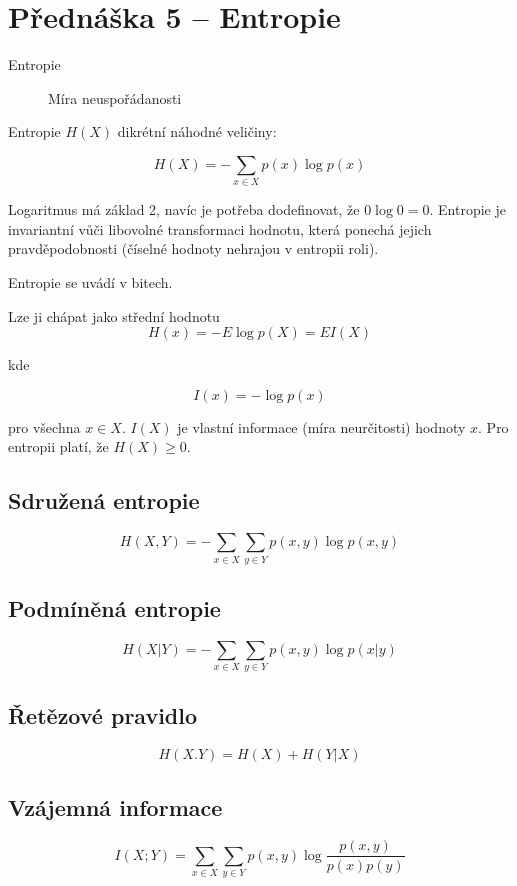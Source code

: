 \section{Přednáška 5 -- Entropie}

\begin{description}
    \item[Entropie] Míra neuspořádanosti
\end{description}

Entropie $H(X)$ dikrétní náhodné veličiny:

$$
    H(X) = - \sum_{x\in X}{p(x) \log{p(x)}}
$$

Logaritmus má základ 2, navíc je potřeba dodefinovat, že $0\log{0} = 0$.
Entropie je invariantní vůči libovolné transformaci hodnotu, která ponechá jejich pravděpodobnosti (číselné hodnoty nehrajou v entropii roli).

Entropie se uvádí v bitech.

Lze ji chápat jako střední hodnotu
$$
    H(x) = -E\log{p(X)} = EI(X)
$$

kde 

$$
    I(x) = -\log{p(x)}
$$

pro všechna $x \in X$. $I(X)$ je vlastní informace (míra neurčitosti) hodnoty $x$.
Pro entropii platí, že $H(X) \geq 0$.

\subsection{Sdružená entropie}

$$
    H(X, Y) = -\sum_{x\in X}{} \sum_{y\in Y}{p(x,y)\log{p(x,y)}}
$$

\subsection{Podmíněná entropie}

$$
    H(X|Y) = -\sum_{x\in X}{} \sum_{y\in Y}{p(x,y)\log{p(x|y)}}
$$

\subsection{Řetězové pravidlo}

$$
    H(X.Y) = H(X) + H(Y|X)
$$

\subsection{Vzájemná informace}

$$
    I(X; Y) = \sum_{x\in X}{} \sum_{y\in Y}{p(x,y)\log{\frac{p(x,y)}{p(x)p(y)}}}
$$

